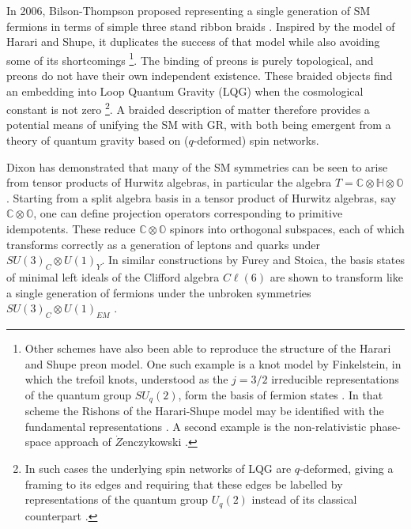 \documentclass[a4paper]{jpconf}
\begin{document}
In 2006, Bilson-Thompson proposed representing a single generation of SM fermions in terms of simple three stand ribbon braids \cite{Bilson-Thompson2005}. Inspired by the model of Harari and Shupe, it duplicates the success of that model while also avoiding some of its shortcomings \footnote{Other schemes have also been able to reproduce the structure of the Harari and Shupe preon model. One such example is a knot model by Finkelstein, in which the trefoil knots, understood as the $j=3/2$ irreducible representations of the quantum group $SU_q(2)$, form the basis of fermion states \cite{Finkelstein2007,Finkelstein2005}. In that scheme the Rishons of the Harari-Shupe model may be identified with the fundamental representations \cite{finkelstein2009knots,finkelstein2014preon}. A second example is the non-relativistic phase-space approach of $\dot{Z}$enczykowski \cite{Zenczykowski2007,Zenczykowski2007a}.}. The binding of preons is purely topological, and preons do not have their own independent existence. These braided objects find an embedding into Loop Quantum Gravity (LQG) when the cosmological constant is not zero \cite{Bilson-Thompson2007} \footnote{In such cases the underlying spin networks of LQG are $q$-deformed, giving a framing to its edges and requiring that these edges be labelled by representations of the quantum group $U_q(2)$ instead of its classical counterpart \cite{smolin2002quantum}.}. A braided description of matter therefore provides a potential means of unifying the SM with GR, with both being emergent from a theory of quantum gravity based on ($q$-deformed) spin networks. 

Dixon has demonstrated that many of the SM symmetries can be seen to arise from tensor products of Hurwitz algebras, in particular the algebra $T=\mathbb{C}\otimes \mathbb{H}\otimes\mathbb{O}$ \cite{dixon2013division,dixon1990derivation,dixon2010division}. Starting from a split algebra basis in a tensor product of Hurwitz algebras, say $\mathbb{C}\otimes\mathbb{O}$, one can define projection operators corresponding to primitive idempotents. These reduce $\mathbb{C}\otimes\mathbb{O}$ spinors into orthogonal subspaces, each of which transforms correctly as a generation of leptons and quarks under $SU(3)_C\otimes U(1)_Y$. In similar constructions by Furey and Stoica, the basis states of minimal left ideals of the Clifford algebra $C\ell(6)$ are shown to transform like a single generation of fermions under the unbroken symmetries $SU(3)_C\otimes U(1)_{EM}$ \cite{furey2016standard,stoica2017standard}. 
\end{document}

